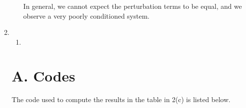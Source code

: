 \documentclass[10pt]{article}
\begin{document}
\begin{enumerate}
\begin{enumerate}
      In general, we cannot expect the perturbation terms to be equal, and we observe a very poorly conditioned system.
    \end{enumerate}

    \item \begin{enumerate}
      \item  
    \end{enumerate}

    \section*{A. Codes}
    The code used to compute the results in the table in 2(c) is listed below.
    {\small }

\end{enumerate}
\end{document}

